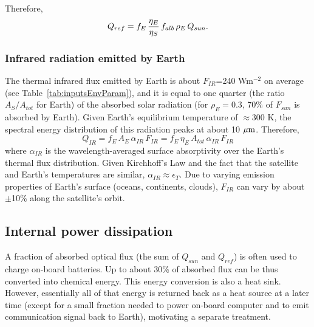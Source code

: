 \documentclass[]{aastex62}
\def\eq#1{\begin{equation} #1 \end{equation}}
\def\mic              {\hbox{$\mu\mathrm{m}$}}
\begin{document}
Therefore, 
\eq{
                          Q_{ref} =  f_E \, {\eta_E \over \eta_S} \, f_{alb} \, \rho_E  \, Q_{sun}. 
}


\subsubsection{Infrared radiation emitted by Earth} 

The thermal infrared flux emitted by Earth is about $F_{IR}$=240 Wm$^{-2}$ on average (see Table~\ref{tab:inputsEnvParam}), 
and it is equal to one quarter (the ratio $A_S/A_{tot}$ for Earth) of the absorbed solar radiation (for $\rho_E=0.3$, 70\% of 
$F_{sun}$ is absorbed by Earth).  Given Earth's equilibrium temperature of $\approx$300 K, the spectral energy 
distribution of this radiation peaks at about 10 $\mic$. Therefore, 
\eq{
              Q_{IR} =  f_E \,  A_E \, \alpha_{IR} \, F_{IR} =  f_E \,  \eta_E \, A_{tot}  \, \alpha_{IR} \, F_{IR} 
}
where $\alpha_{IR}$ is the wavelength-averaged surface absorptivity over the Earth's thermal flux distribution.
Given Kirchhoff's Law and the fact that the satellite and Earth's temperatures are similar, 
$\alpha_{IR} \approx \epsilon_T$. Due to varying emission properties of Earth's surface (oceans, continents,
clouds), $F_{IR}$ can vary by about $\pm$10\% along the satellite's orbit. 



\subsection{Internal power dissipation \label{sec:batteries}} 

A fraction of absorbed optical flux (the sum of $Q_{sun}$ and $Q_{ref}$) is often used to charge 
on-board batteries. Up to about 30\% of absorbed flux can be thus converted into chemical energy.
This energy conversion is also a heat sink. However, essentially all of that energy is returned back 
as a heat source at a later time (except for a small fraction needed to power on-board computer and
to emit communication signal back to Earth), motivating a separate treatment.  
\end{document}
